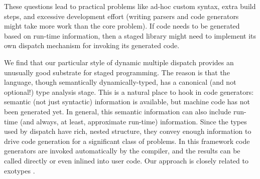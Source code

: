 \noindent
These questions lead to practical problems like ad-hoc custom syntax,
extra build steps, and excessive development effort (writing parsers and
code generators might take more work than the core problem).
If code needs to be generated based on run-time information, then a
staged library might need to implement its own dispatch mechanism
for invoking its generated code.

We find that our particular style of dynamic multiple dispatch provides
an unusually good substrate for staged programming.
The reason is that the language, though semantically dynamically-typed,
has a canonical (and not optional!) type analysis stage.
This is a natural place to hook in code generators: semantic (not just
syntactic) information is available, but machine code has not been
generated yet.
In general, this semantic information can also include run-time (and
always, at least, approximate run-time) information.
Since the types used by dispatch have rich, nested structure, they
convey enough information to drive code generation for a significant
class of problems.
In this framework code generators are invoked automatically by
the compiler, and the results can be called directly or even inlined
into user code.
Our approach is closely related to exotypes
\cite{DeVito:2014:FRG:2594291.2594307}.









